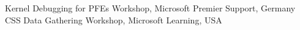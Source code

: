 %
%
%


\begin{scholarship}
					{Kernel Debugging for PFEs Workshop, Microsoft Premier Support, Germany}
					{CSS Data Gathering Workshop, Microsoft Learning, USA}
\end{scholarship}